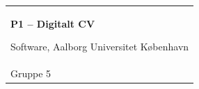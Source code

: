 %
\begin{titlepage}
\vspace*{\fill}
  \noindent%
  {\color{white}\colorbox{aaublue}{\begin{tabular}{@{}p{\textwidth}@{}}
    \begin{center}
    \Huge{\textbf{%
      P1 -- Digitalt CV
    }}
    \end{center}
    \begin{center}
      \Large{%
        Software, Aalborg Universitet København
      }
    \end{center}
    \vspace{0.2cm}
   \begin{center}
    {\Large%
      Hans~Erik~Heje, Mikkel~Kaa, David~Doctor~Heyde~Rasmussen, Ming~Hui~Sun \& Kristoffer ~Bach~Wilhjelm
    }\\
    \vspace{0.2cm}
    {\large%
      Gruppe 5
    }
   \end{center}
   \vspace{0.2cm}


\end{tabular}}}
\end{titlepage}

